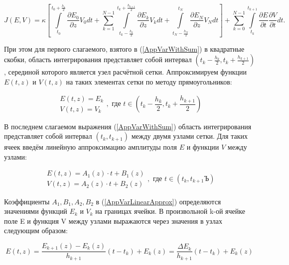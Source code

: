 \begin{equation}\label{AppVarWithSum}
J(E, V) = \kappa \left[ \int\limits_{t_0}^{t_0+\frac{h_1}{2}} \dfrac{\partial E_0}{\partial z} V_0 dt +
          \sum\limits_{k=1}^{N-1} \int\limits_{t_k-\frac{h_k}{2}}^{t_k+\frac{h_{k+1}}{2}} \dfrac{\partial E_k}{\partial z} V_k dt +
          \int\limits_{t_N-\frac{h_N}{2}}^{t_N} \dfrac{\partial E_N}{\partial z} V_N dt \right] +
          \sum\limits_{k=0}^{N-1} \int\limits_{t_k}^{t_{k+1}} \dfrac{\partial E}{\partial t}\dfrac{\partial V}{\partial t} dt.
\end{equation}

При этом для первого слагаемого, взятого в (\ref{AppVarWithSum}) в квадратные скобки, область
интегрирования представляет собой интервал $\left(t_k-\frac{h_k}{2}, t_k+\frac{h_{k+1}}{2}\right)$,
серединой которого является узел расчётной сетки. Аппроксимируем функции
$E(t, z)$ и $V(t, z)$ на таких элементах сетки по методу прямоугольников:

\begin{equation}\label{AppVarConstApprox}
	\begin{array}{c}
		E(t, z) = E_k \\
		V(t, z) = V_k
	\end{array},
	\text{ где } t \in \left(t_k-\frac{h_k}{2}, t_k+\frac{h_{k+1}}{2}\right)
\end{equation}

В последнем слагаемом выражения (\ref{AppVarWithSum})  область  интегрирования представляет собой
интервал $\left(t_k, t_{k+1}\right)$ между двумя узлами сетки. Для таких ячеек введём
линейную аппроксимацию амплитуды поля $E$ и функции $V$ между узлами:

\begin{equation}\label{AppVarLinearApprox}
	\begin{array}{c}
		E(t, z) = A_1(z) \cdot t + B_1(z) \\
		V(t, z) = A_2(z) \cdot t + B_2(z)
	\end{array},
	\text{ где } t \in \left(t_k, t_{k+1}Ъ\right)
\end{equation}

Коэффициенты $A_1, B_1, A_2, B_2$ в (\ref{AppVarLinearApprox}) определяются значениями функций $E_k$ и
$V_k$ на границах ячейки. В произвольной k-ой ячейке поле E и функция V между узлами выражаются
через значения в узлах следующим образом:

\begin{equation}\label{AppVarEApprox}
E(t, z) = \frac{E_{k+1}(z) - E_k(z)}{h_{k+1}}(t - t_k) + E_k(z) = \frac{\Delta E_k}{h_{k+1}}(t - t_k) + E_k(z)
\end{equation}

